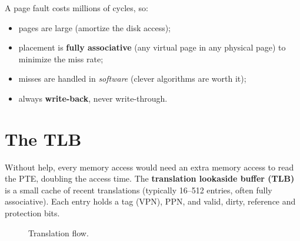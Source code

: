 \begin{important}
A page fault costs millions of cycles, so:
\begin{itemize}
  \item pages are large (amortize the disk access);
  \item placement is \textbf{fully associative} (any virtual page in any
    physical page) to minimize the miss rate;
  \item misses are handled in \emph{software} (clever algorithms are worth it);
  \item always \textbf{write-back}, never write-through.
\end{itemize}
\end{important}

\section{The TLB}

Without help, every memory access would need an extra memory access to read
the PTE, doubling the access time. The \textbf{translation lookaside
buffer (TLB)} is a small cache of recent translations (typically 16--512
entries, often fully associative). Each entry holds a tag (VPN), PPN, and
valid, dirty, reference and protection bits.

\begin{figure}[H]
\centering
{}
\caption{Translation flow.}
\end{figure}

